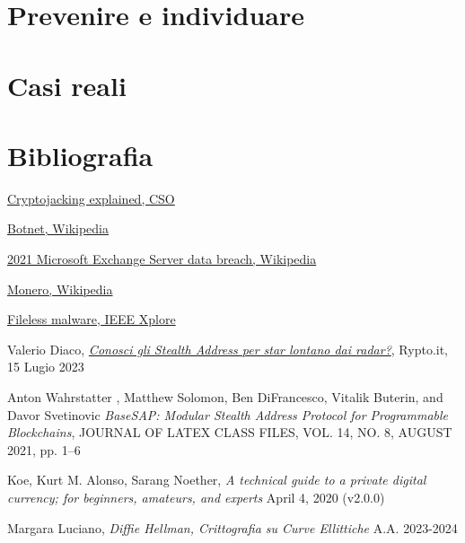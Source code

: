 \documentclass[12pt,a4paper]{article}
\begin{document}
\newpage

\section{Prevenire e individuare}

\newpage

\section{Casi reali}

\newpage

\section{Bibliografia}
\begin{thebibliography}{9}

\href{https://arc.net/l/quote/karbftmg}{Cryptojacking explained, CSO}

\href{https://arc.net/l/quote/ftyxgxms}{Botnet, Wikipedia}

\href{https://arc.net/l/quote/golshtco}{2021 Microsoft Exchange Server data breach, Wikipedia}

\href{https://arc.net/l/quote/jffmkeln}{Monero, Wikipedia}

\href{https://arc.net/l/quote/kbarlqni}{Fileless malware, IEEE Xplore}

Valerio Diaco, \href{https://arc.net/l/quote/qirrmtbh}{\textit{Conosci gli
Stealth Address per star lontano dai radar?}}, Rypto.it, 15 Lugio 2023

Anton Wahrstatter , Matthew Solomon, Ben DiFrancesco, Vitalik Buterin, and Davor
Svetinovic \textit{BaseSAP: Modular Stealth Address Protocol for Programmable
Blockchains}, JOURNAL OF LATEX CLASS FILES, VOL. 14, NO. 8, AUGUST 2021, pp. 1–6

Koe, Kurt M. Alonso, Sarang Noether, \textit{A technical guide to a private
digital currency; for beginners, amateurs, and experts} April 4, 2020 (v2.0.0)

Margara Luciano, \textit{Diffie Hellman, Crittografia su Curve Ellittiche} A.A.
2023-2024

\end{thebibliography}
\end{document}
